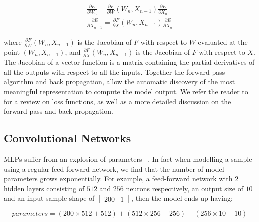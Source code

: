 \begin{subequations}
\begin{gather}
	\frac{\partial E} {\partial W_n} = \frac{\partial F} {\partial W}(W_n, X_{n-1})\frac{\partial E} {\partial X_n} \\
	\frac{\partial E} {\partial X_{n-1}} = \frac{\partial F} {\partial X}(W_n, X_{n-1})\frac{\partial E} {\partial X_n} 
\end{gather}
\end{subequations}

where $\frac{\partial F} {\partial W}(W_n, X_{n-1})$ is the Jacobian of $F$ with respect to $W$ evaluated at the point $(W_n, X_{n-1})$, and  $\frac{\partial F} {\partial X}(W_n, X_{n-1})$ is the Jacobian of $F$ with respect to $X$. The Jacobian of a vector function is a matrix containing the partial derivatives of all the outputs with respect to all the inputs. Together the forward pass algorithm and back propagation, allow the automatic discovery of the most meaningful representation to compute the model output. We refer the reader to ~\citep{Goodfellow-et-al-2016} for a review on loss functions, as well as a more detailed discussion on the forward pass and back propagation. 

\subsection{Convolutional Networks}

MLPs suffer from an explosion of parameters  ~\citep{krizhevsky2012imagenet}. In fact when modelling a sample using a regular feed-forward network, we find that the number of model parameters grows exponentially. For example, a feed-forward network with $2$ hidden layers consisting of $512$ and $256$ neurons respectively, an output size of $10$ and an input sample shape of $\left [ \begin{matrix} 200 & 1 \end{matrix} \right] $, then the model ends up having: 

\begin{equation}
	parameters = (200 \times 512 + 512) + (512 \times 256 + 256) + (256 \times 10 + 10)
\end{equation}

